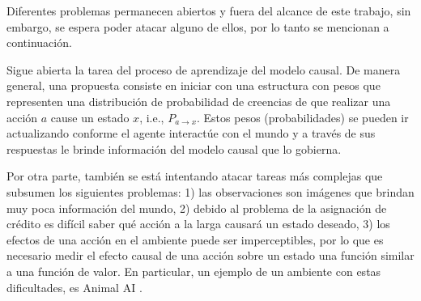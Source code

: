 Diferentes problemas permanecen abiertos y fuera del alcance de este trabajo, sin embargo, se espera poder atacar alguno de ellos, por lo tanto se mencionan a continuación.

Sigue abierta la tarea del proceso de aprendizaje del modelo
causal. De manera general, una propuesta consiste en iniciar con una estructura con pesos que representen 
una distribución de probabilidad de creencias de que realizar una acción $a$ cause un estado $x$, i.e., $P_{a\rightarrow x}$. Estos pesos (probabilidades) se pueden
ir actualizando conforme el agente interactúe con el mundo y
a través de sus respuestas le brinde información del modelo causal que lo gobierna.


Por otra parte, también se está intentando atacar tareas más 
complejas que subsumen los siguientes problemas: 1) las observaciones son imágenes que brindan muy poca información del mundo, 2) debido al problema de la asignación de crédito es difícil saber qué acción a la larga causará un estado deseado, 3) los efectos de una acción en el ambiente puede ser imperceptibles, por lo que es necesario medir el efecto causal de una acción sobre un estado una función similar a una función de valor. En particular, un ejemplo de un ambiente con estas dificultades, es Animal AI \cite{beyret2019animalai}.


